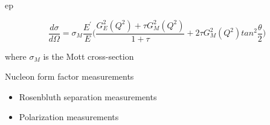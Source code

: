 %
%
%

\begin{frame}{ep}

\begin{equation*}
  \frac{d\sigma}{d\Omega} =
     \sigma_{M} \frac{E^{\prime}}{E}
     \Big( \frac{ G^{2}_{E}(Q^2) + \tau G^{2}_{M}(Q^2) }{ 1+\tau } +
           2 \tau G^{2}_{M}(Q^2) tan^{2}\frac{\theta}{2} \Big)
\end{equation*}

where
$\sigma_{M}$ is the Mott cross-section

\end{frame}


%
%
%

\begin{frame}{Nucleon form factor measurements}

\begin{itemize}
  \item Rosenbluth separation measurements
  \item Polarization measurements
\end{itemize}

\end{frame}

%
%
%

